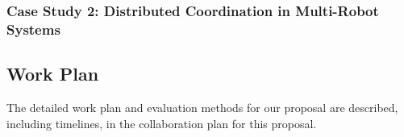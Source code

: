 

\subsubsection{Case Study 2: Distributed Coordination in Multi-Robot Systems}
\label{sec:case-study-robots}



\subsection{Work Plan}

The detailed work plan and evaluation methods for our proposal are
described, including timelines, in the collaboration plan for this proposal.

%

% 



